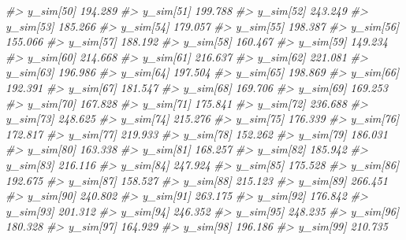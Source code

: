\documentclass[
  10pt,
  italian,
  a4paper,
  extrafontsizes,onecolumn,openright
  ]{memoir}
\newenvironment{Shaded}{\begin{snugshade}}{\end{snugshade}}
\newcommand{\CommentTok}[1]{\textcolor[rgb]{0.56,0.35,0.01}{\textit{#1}}}
\begin{document}
\begin{Shaded}
\begin{Highlighting}[]
\CommentTok{\#\textgreater{}   y\_sim[50]  194.289}
\CommentTok{\#\textgreater{}   y\_sim[51]  199.788}
\CommentTok{\#\textgreater{}   y\_sim[52]  243.249}
\CommentTok{\#\textgreater{}   y\_sim[53]  185.266}
\CommentTok{\#\textgreater{}   y\_sim[54]  179.057}
\CommentTok{\#\textgreater{}   y\_sim[55]  198.387}
\CommentTok{\#\textgreater{}   y\_sim[56]  155.066}
\CommentTok{\#\textgreater{}   y\_sim[57]  188.192}
\CommentTok{\#\textgreater{}   y\_sim[58]  160.467}
\CommentTok{\#\textgreater{}   y\_sim[59]  149.234}
\CommentTok{\#\textgreater{}   y\_sim[60]  214.668}
\CommentTok{\#\textgreater{}   y\_sim[61]  216.637}
\CommentTok{\#\textgreater{}   y\_sim[62]  221.081}
\CommentTok{\#\textgreater{}   y\_sim[63]  196.986}
\CommentTok{\#\textgreater{}   y\_sim[64]  197.504}
\CommentTok{\#\textgreater{}   y\_sim[65]  198.869}
\CommentTok{\#\textgreater{}   y\_sim[66]  192.391}
\CommentTok{\#\textgreater{}   y\_sim[67]  181.547}
\CommentTok{\#\textgreater{}   y\_sim[68]  169.706}
\CommentTok{\#\textgreater{}   y\_sim[69]  169.253}
\CommentTok{\#\textgreater{}   y\_sim[70]  167.828}
\CommentTok{\#\textgreater{}   y\_sim[71]  175.841}
\CommentTok{\#\textgreater{}   y\_sim[72]  236.688}
\CommentTok{\#\textgreater{}   y\_sim[73]  248.625}
\CommentTok{\#\textgreater{}   y\_sim[74]  215.276}
\CommentTok{\#\textgreater{}   y\_sim[75]  176.339}
\CommentTok{\#\textgreater{}   y\_sim[76]  172.817}
\CommentTok{\#\textgreater{}   y\_sim[77]  219.933}
\CommentTok{\#\textgreater{}   y\_sim[78]  152.262}
\CommentTok{\#\textgreater{}   y\_sim[79]  186.031}
\CommentTok{\#\textgreater{}   y\_sim[80]  163.338}
\CommentTok{\#\textgreater{}   y\_sim[81]  168.257}
\CommentTok{\#\textgreater{}   y\_sim[82]  185.942}
\CommentTok{\#\textgreater{}   y\_sim[83]  216.116}
\CommentTok{\#\textgreater{}   y\_sim[84]  247.924}
\CommentTok{\#\textgreater{}   y\_sim[85]  175.528}
\CommentTok{\#\textgreater{}   y\_sim[86]  192.675}
\CommentTok{\#\textgreater{}   y\_sim[87]  158.527}
\CommentTok{\#\textgreater{}   y\_sim[88]  215.123}
\CommentTok{\#\textgreater{}   y\_sim[89]  266.451}
\CommentTok{\#\textgreater{}   y\_sim[90]  240.802}
\CommentTok{\#\textgreater{}   y\_sim[91]  263.175}
\CommentTok{\#\textgreater{}   y\_sim[92]  176.842}
\CommentTok{\#\textgreater{}   y\_sim[93]  201.312}
\CommentTok{\#\textgreater{}   y\_sim[94]  246.352}
\CommentTok{\#\textgreater{}   y\_sim[95]  248.235}
\CommentTok{\#\textgreater{}   y\_sim[96]  180.328}
\CommentTok{\#\textgreater{}   y\_sim[97]  164.929}
\CommentTok{\#\textgreater{}   y\_sim[98]  196.186}
\CommentTok{\#\textgreater{}   y\_sim[99]  210.735}

\end{Highlighting}
\end{Shaded}
\end{document}
